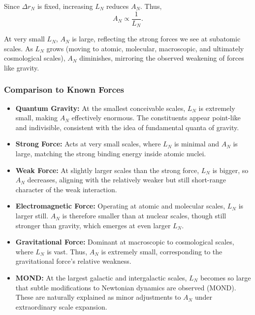 \documentclass{report}
\begin{document}
Since $\Delta r_N$ is fixed, increasing $L_N$ reduces $A_N$. Thus,
\[
A_N \propto \frac{1}{L_N}.
\]

At very small $L_N$, $A_N$ is large, reflecting the strong forces we see at subatomic scales. As $L_N$ grows (moving to atomic, molecular, macroscopic, and ultimately cosmological scales), $A_N$ diminishes, mirroring the observed weakening of forces like gravity.

\subsubsection*{Comparison to Known Forces}

\begin{itemize}
    \item \textbf{Quantum Gravity:}  
    At the smallest conceivable scales, $L_N$ is extremely small, making $A_N$ effectively enormous. The constituents appear point-like and indivisible, consistent with the idea of fundamental quanta of gravity.

    \item \textbf{Strong Force:}  
    Acts at very small scales, where $L_N$ is minimal and $A_N$ is large, matching the strong binding energy inside atomic nuclei.

    \item \textbf{Weak Force:}  
    At slightly larger scales than the strong force, $L_N$ is bigger, so $A_N$ decreases, aligning with the relatively weaker but still short-range character of the weak interaction.

    \item \textbf{Electromagnetic Force:}  
    Operating at atomic and molecular scales, $L_N$ is larger still. $A_N$ is therefore smaller than at nuclear scales, though still stronger than gravity, which emerges at even larger $L_N$.

    \item \textbf{Gravitational Force:}  
    Dominant at macroscopic to cosmological scales, where $L_N$ is vast. Thus, $A_N$ is extremely small, corresponding to the gravitational force’s relative weakness.

    \item \textbf{MOND:}  
    At the largest galactic and intergalactic scales, $L_N$ becomes so large that subtle modifications to Newtonian dynamics are observed (MOND). These are naturally explained as minor adjustments to $A_N$ under extraordinary scale expansion.
\end{itemize}
\end{document}
